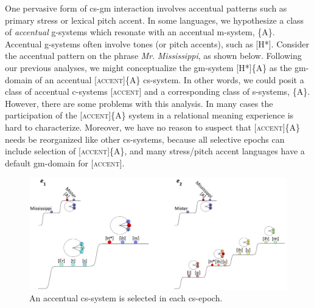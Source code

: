One pervasive form of cs-gm interaction involves accentual patterns such as primary stress or lexical pitch accent. In some languages, we hypothesize a class of \textit{accentual} g-systems which resonate with an accentual m-system, \{A\}. Accentual g-systems often involve tones (or pitch accents), such as [H*]. Consider the accentual pattern on the phrase \textit{Mr}. \textit{Mississippi}, as shown below. Following our previous analyses, we might conceptualize the gm-system [H*]\{A\} as the gm-domain of an accentual [\textsc{accent}]\{A\} cs-system. In other words, we could posit a class of accentual c-systems [\textsc{accent}] and a corresponding class of s-systems, \{A\}. However, there are some problems with this analysis. In many cases the participation of the [\textsc{accent}]\{A\} system in a relational meaning experience is hard to characterize. Moreover, we have no reason to suspect that [\textsc{accent}]\{A\} needs be reorganized like other cs-systems, because all selective epochs can include selection of [\textsc{accent}]\{A\}, and many stress/pitch accent languages have a default gm-domain for [\textsc{accent}].

  
\begin{figure}
\includegraphics[width=\textwidth]{figures/Tilsen-img63.png}
\caption{An accentual cs-system is selected in each cs-epoch.}
\label{fig:4:13}
\end{figure}
 

